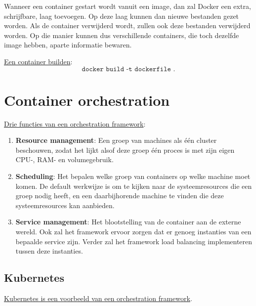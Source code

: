 \documentclass{report}
\begin{document}
	Wanneer een container gestart wordt vanuit een image, dan zal Docker een extra, schrijfbare, laag toevoegen. Op deze laag kunnen dan nieuwe bestanden gezet worden. Als de container verwijderd wordt, zullen ook deze bestanden verwijderd worden. Op die manier kunnen dus verschillende containers, die toch dezelfde image hebben, aparte informatie bewaren. 

	\underline{Een container builden}:
$$\texttt{docker build -t dockerfile .}$$
	\chapter{Container orchestration}
	\underline{Drie functies van een orchestration framework}:
	\begin{enumerate}
		\item \textbf{Resource management}: Een groep van machines als één cluster beschouwen, zodat het lijkt alsof deze groep één proces is met zijn eigen CPU-, RAM- en volumegebruik.
		\item \textbf{Scheduling}: Het bepalen welke groep van containers op welke machine moet komen. De default werkwijze is om te kijken naar de systeemresources die een groep nodig heeft, en een daarbijhorende machine te vinden die deze systeemresources kan aanbieden.
		\item \textbf{Service management}: Het blootstelling van de container aan de externe wereld. Ook zal het framework ervoor zorgen dat er genoeg instanties van een bepaalde service zijn. Verder zal het framework load balancing implementeren tussen deze instanties.
	\end{enumerate}

	\section{Kubernetes}
	\underline{Kubernetes is een voorbeeld van een orchestration framework}.
\end{document}
